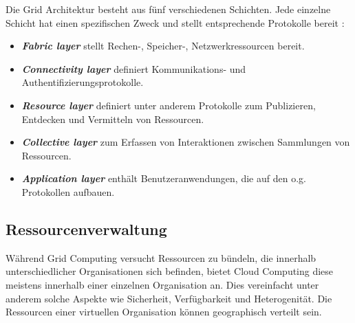 Die Grid Architektur besteht aus fünf verschiedenen Schichten. Jede einzelne Schicht hat einen spezifischen Zweck und stellt entsprechende Protokolle bereit \cite{360-degree-compared}:

\begin{itemize}
\item \textbf{\textit{Fabric layer}} stellt Rechen-, Speicher-, Netzwerkressourcen bereit.
\item \textbf{\textit{Connectivity layer}} definiert Kommunikations- und Authentifizierungsprotokolle.
\item \textbf{\textit{Resource layer}} definiert unter anderem Protokolle zum Publizieren, Entdecken und Vermitteln von Ressourcen.
\item \textbf{\textit{Collective layer}} zum Erfassen von Interaktionen zwischen Sammlungen von Ressourcen.
\item \textbf{\textit{Application layer}} enthält Benutzeranwendungen, die auf den o.g. Protokollen aufbauen.
\end{itemize}







\subsection{Ressourcenverwaltung}
Während Grid Computing versucht Ressourcen zu bündeln, die innerhalb unterschiedlicher Organisationen sich befinden, bietet Cloud Computing diese meistens innerhalb einer einzelnen Organisation an. Dies vereinfacht unter anderem solche Aspekte wie Sicherheit, Verfügbarkeit und Heterogenität\cite{comp-cloud-grid-cluster-virt}.
Die Ressourcen einer virtuellen Organisation können geographisch verteilt sein.

